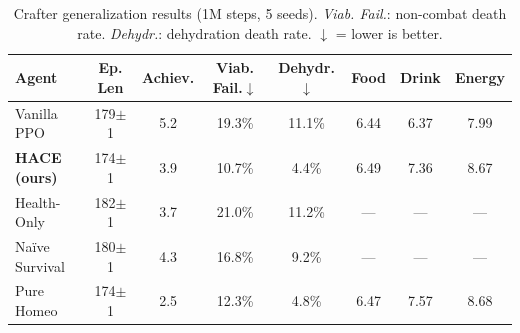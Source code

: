 \begin{table}[t]
\centering\small
\caption{Crafter generalization results (1M steps, 5 seeds). 
\emph{Viab. Fail.}: non-combat death rate. 
\emph{Dehydr.}: dehydration death rate. $\downarrow$ = lower is better.}
\label{tab:crafter}
\begin{tabular}{@{}lccccccc@{}}
\toprule
\textbf{Agent} & \textbf{Ep. Len} & \textbf{Achiev.} & \textbf{Viab. Fail.$\downarrow$} & \textbf{Dehydr.$\downarrow$} & \textbf{Food} & \textbf{Drink} & \textbf{Energy} \\
\midrule
Vanilla PPO & 179$\pm$1 & 5.2 & 19.3\% & 11.1\% & 6.44 & 6.37 & 7.99 \\
\textbf{HACE (ours)} & 174$\pm$1 & 3.9 & 10.7\% & 4.4\% & 6.49 & 7.36 & 8.67 \\
Health-Only & 182$\pm$1 & 3.7 & 21.0\% & 11.2\% & --- & --- & --- \\
Naïve Survival & 180$\pm$1 & 4.3 & 16.8\% & 9.2\% & --- & --- & --- \\
Pure Homeo & 174$\pm$1 & 2.5 & 12.3\% & 4.8\% & 6.47 & 7.57 & 8.68 \\
\bottomrule
\end{tabular}
\end{table}